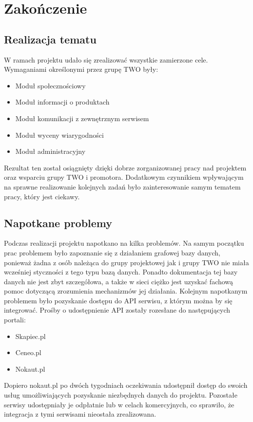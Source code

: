 \chapter{Zakończenie}

\section{Realizacja tematu}

W ramach projektu udało się zrealizować wszystkie zamierzone cele. Wymaganiami określonymi przez grupę TWO były:
\begin{itemize}
\item Moduł społecznościowy
\item Moduł informacji o produktach
\item Moduł komunikacji z zewnętrznym serwisem
\item Moduł wyceny wiarygodności
\item Moduł administracyjny
\end{itemize}
Rezultat ten został osiągnięty dzięki dobrze zorganizowanej pracy nad projektem oraz wsparciu grupy TWO i promotora. Dodatkowym czynnikiem wpływającym na sprawne realizowanie kolejnych zadań było zainteresowanie samym tematem pracy, który jest ciekawy.

\section{Napotkane problemy}

Podczas realizacji projektu napotkano na kilka problemów. Na samym początku prac problemem było zapoznanie się z działaniem grafowej bazy danych, ponieważ żadna z osób należąca do grupy projektowej jak i grupy TWO nie miała wcześniej styczności z tego typu bazą danych. Ponadto dokumentacja tej bazy danych nie jest zbyt szczegółowa, a także w sieci ciężko jest uzyskać fachową pomoc dotyczącą zrozumienia mechanizmów jej działania.
Kolejnym napotkanym problemem było pozyskanie dostępu do API serwisu, z którym można by się integrować. Prośby o udostępnienie API zostały rozesłane do następujących portali:
\begin{itemize}
\item Skapiec.pl
\item Ceneo.pl
\item Nokaut.pl
\end{itemize}
Dopiero nokaut.pl po dwóch tygodniach oczekiwania udostępnił dostęp do swoich usług umożliwiających pozyskanie niezbędnych danych do projektu. Pozostałe serwisy udostępniały je odpłatnie lub w celach komercyjnych, co sprawiło, że integracja z tymi serwisami nieostała zrealizowana.


